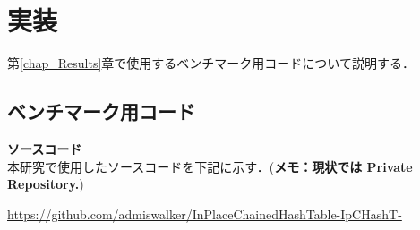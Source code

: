 \chapter{実装}
\label{chap_Implementation}

第\ref{chap_Results}章で使用するベンチマーク用コードについて説明する．

\section{ベンチマーク用コード}

{\bf ソースコード}
\samepage \\ \indent
本研究で使用したソースコードを下記に示す．({\bf \color{red}メモ：現状では Private Repository.})
\begin{center}
  \url{https://github.com/admiswalker/InPlaceChainedHashTable-IpCHashT-}
\end{center}

